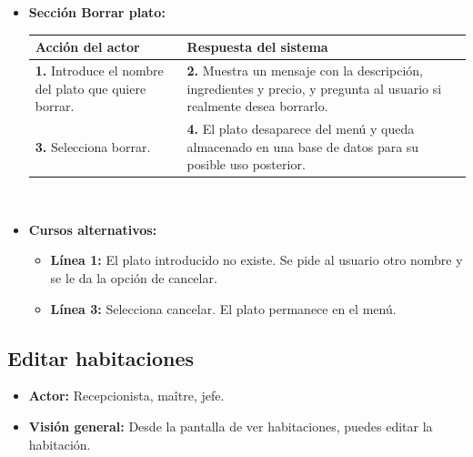 \documentclass[spanish,a4paper,11pt, twoside]{report}	%
\begin{document}
\begin{itemize}
			\item \textbf{Sección Borrar plato:} 	\\
				\begin{tabular}{|p{6cm}||p{6cm}|}
				\hline
				\textbf{Acción del actor} & \textbf{Respuesta del sistema} \\ \hline \hline
				\textbf{1.} Introduce el nombre del plato que quiere borrar. & \textbf{2.} Muestra un mensaje con la descripción, ingredientes y precio, y pregunta al usuario si realmente desea borrarlo.\\ \hline 
				\textbf{3.} Selecciona borrar. & \textbf{4.} El plato desaparece del menú y queda almacenado en una base de datos para su posible uso posterior. \\ \hline
			\end{tabular}
			\\
			\item \textbf{Cursos alternativos:} 
			\begin{itemize}
			\item  \textbf{Línea 1:} El plato introducido no existe. Se pide al usuario otro nombre y se le da la opción de cancelar.
			\item  \textbf{Línea 3:} Selecciona cancelar. El plato permanece en el menú.
			\end {itemize}
		\end {itemize}



	\subsection{Editar habitaciones}
		\begin{itemize}
			\item \textbf{Actor:} Recepcionista, maître, jefe.
			\item \textbf{Visión general:} Desde la pantalla de ver habitaciones, puedes editar la habitación.	
		\end {itemize}



\newpage
\mbox{}
\thispagestyle{empty}						%
\newpage
\end{document}
